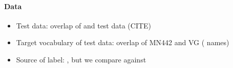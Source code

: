 \paragraph{Data}
\begin{itemize}
	\item Test data: overlap of \mn and \vg test data (CITE)
	\item Target vocabulary of test data: overlap of MN442 and VG ( names)
	\item Source of label: \mn, but we compare against \vg
\end{itemize}



